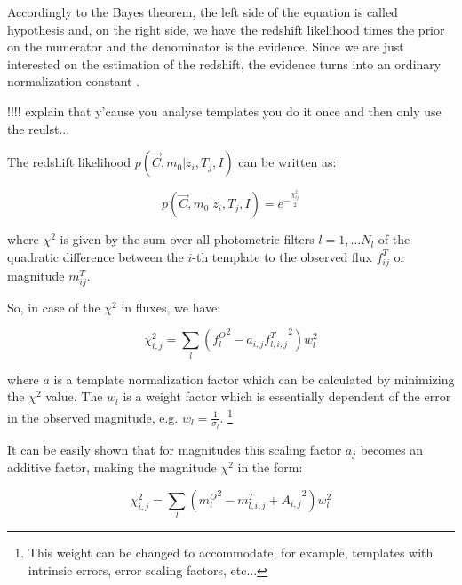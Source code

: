 \documentclass[9pt]{memoir}
\begin{document}
Accordingly to the Bayes theorem, the left side of the equation is called hypothesis and, on the right side, we have the redshift likelihood times the prior on the numerator and the denominator is the evidence. Since we are just interested on the estimation of the redshift, the evidence turns into an ordinary normalization constant \citep{Sivia.Skilling.2006}.

!!!! explain that y'cause you analyse templates you do it once and then only use the reulst...


The redshift likelihood $p(\vec{C}, m_0|z_i,T_j,I)$ can be written as:

\begin{equation}
p(\vec{C}, m_0|z_i,T_j,I) = e^{-\frac{\chi_{ij}^2}{2}}
\end{equation}

\noindent where $\chi^2$ is given by the sum over all photometric filters $l = 1, \ldots N_l$ of the quadratic difference between the $i$-th template to the observed flux $f^T_{ij}$ or magnitude $m^T_{ij}$.

So, in case of the $\chi^2$ in fluxes, we have:

\begin{equation}
\chi^2_{i,j} = \sum_l \left( {f^O_l}^2 - a_{i,j} {f^T_{l,i,j}}^2 \right) w^2_l
\end{equation}

\noindent where $a$ is a template normalization factor which can be calculated by minimizing the $\chi^2$ value. The $w_l$ is a weight factor which is essentially dependent of the error in the observed magnitude, e.g. $w_l = \frac{1}{\sigma_l}$. \footnote{This weight can be changed to accommodate, for example, templates with intrinsic errors, error scaling factors, etc...}

It can be easily shown that for magnitudes this scaling factor $a_j$ becomes an additive factor, making the magnitude $\chi^2$ in the form:

\begin{equation}
\chi^2_{i,j} = \sum_l \left( {m^O_l}^2 - {m^T_{l,i,j} + A_{i,j}}^2 \right) w^2_l
\end{equation}
\end{document}
